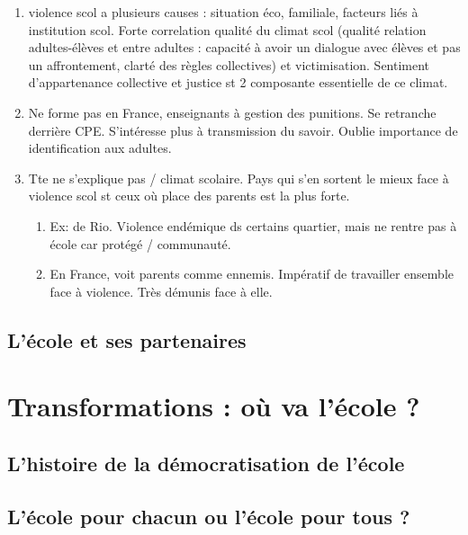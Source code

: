 \documentclass[12pt]{report}
\begin{document}
\begin{itemize}
\begin{itemize}
{\begin{minipage}{19cm}
\begin{enumerate}
\item violence scol a plusieurs causes : situation éco, familiale, facteurs liés à institution scol. Forte correlation qualité du climat scol (qualité relation adultes-élèves et entre adultes : capacité à avoir un dialogue avec élèves et pas un affrontement, clarté des règles collectives) et victimisation. Sentiment d'appartenance collective et justice st 2 composante essentielle de ce climat.\\
\item Ne forme pas en France, enseignants à gestion des punitions. Se retranche derrière CPE. S'intéresse plus à transmission du savoir. Oublie importance de identification aux adultes.\\
\item  Tte ne s'explique pas / climat scolaire. Pays qui s'en sortent le mieux face à violence scol st ceux où place des parents est la plus forte.
\begin{enumerate}
\item Ex: de Rio. Violence endémique ds certains quartier, mais ne rentre pas à école car protégé / communauté. 
\item En France, voit parents comme ennemis. Impératif de travailler ensemble face à violence. Très démunis face à elle.
\end{enumerate}
\end{enumerate}

\end{minipage}
}


\end{itemize}

\chapter{L'école et ses partenaires}

\part{Transformations : où va l'école ?}

\chapter{L'histoire de la démocratisation de l'école}

\chapter{L'école pour chacun ou l'école pour tous ?}


\end{itemize}
\end{document}
